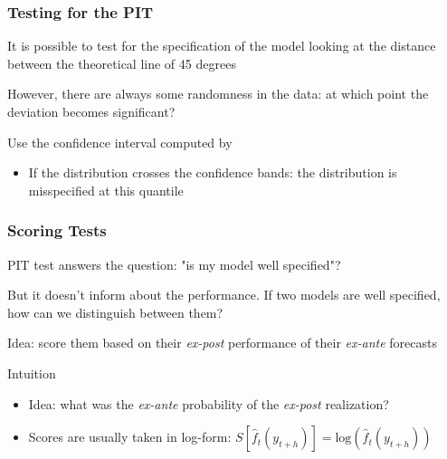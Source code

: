 \documentclass{beamer}
\newenvironment{wideitemize}{\itemize\addtolength{\itemsep}{10pt}}{\enditemize}
\begin{document}
\begin{frame}
  \frametitle{Testing for the PIT}
  \begin{wideitemize}
    \item It is possible to test for the specification of the model looking at the distance between the theoretical line of 45 degrees
    \item However, there are always some randomness in the data: at which point the deviation becomes significant?
    \item Use the confidence interval computed by \href{https://ideas.repec.org/a/eee/econom/v208y2019i2p638-657.html}{}
      \begin{itemize}
      \item If the distribution crosses the confidence bands: the distribution is misspecified at this quantile
      \end{itemize}    
  \end{wideitemize}
\end{frame}


\begin{frame}
  \frametitle{Scoring Tests}
  \begin{wideitemize}
  \item PIT test answers the question: "is my model well specified"? 
  \item But it doesn't inform about the performance. If two models are well specified, how can we distinguish between them?
  \item Idea: score them based on their \emph{ex-post} performance of their \emph{ex-ante} forecasts
  \end{wideitemize}

  \begin{exampleblock}{Intuition}
    \begin{itemize}
    \item Idea: what was the \emph{ex-ante} probability of the \emph{ex-post} realization?
    \item Scores are usually taken in log-form: $S\left[\hat{f}_t(y_{t+h})\right] = \text{log}\left(\hat{f}_t(y_{t+h})\right)$
    \end{itemize}
  \end{exampleblock}
  
\end{frame}
\end{document}
